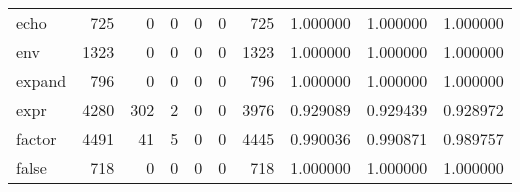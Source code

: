 \begin{longtable}{lrrrrrrrrr}
echo      &                                                725 &                                                  0 &                                                  0 &                                                  0 &                                                  0 &                                                725 &                                           1.000000 &                               1.000000 &                             1.000000 \\
env       &                                               1323 &                                                  0 &                                                  0 &                                                  0 &                                                  0 &                                               1323 &                                           1.000000 &                               1.000000 &                             1.000000 \\
expand    &                                                796 &                                                  0 &                                                  0 &                                                  0 &                                                  0 &                                                796 &                                           1.000000 &                               1.000000 &                             1.000000 \\
expr      &                                               4280 &                                                302 &                                                  2 &                                                  0 &                                                  0 &                                               3976 &                                           0.929089 &                               0.929439 &                             0.928972 \\
factor    &                                               4491 &                                                 41 &                                                  5 &                                                  0 &                                                  0 &                                               4445 &                                           0.990036 &                               0.990871 &                             0.989757 \\
false     &                                                718 &                                                  0 &                                                  0 &                                                  0 &                                                  0 &                                                718 &                                           1.000000 &                               1.000000 &                             1.000000 \\

\end{longtable}
